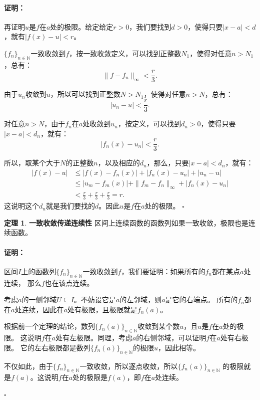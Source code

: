 \documentclass[12pt,UTF8]{ctexbook}
\theoremstyle{definition}
\newtheorem{tm}{定理}[section]
\theoremstyle{plain}
\renewenvironment{proof}{\paragraph{\textbf{证明：}}}{\hfill$\square$}
\begin{document}
\begin{appendix}
\begin{proof}
    再证明$u$是$f$在$a$处的极限。给定给定$r>0$，我们要找到$d>0$，使得只要$|x - a| < d$，就有$|f(x) - u| < r$。
    
    $\{f_n\}_{n\in\mathbb{N}}$一致收敛到$f$，按一致收敛定义，可以找到正整数$N_1$，使得对任意$n>N_1$，总有：
    $$ \| f - f_n\|_{\infty} < \frac{r}{3}.$$

    由于$u_n$收敛到$u$，所以可以找到正整数$N>N_1$，使得对任意$n>N$，总有：
    $$ |u_n - u| < \frac{r}{3}.$$
    
    对任意$n>N$，由于$f_n$在$a$处收敛到$u_n$，按定义，可以找到$d_n > 0$，使得只要$|x - a| < d_n$，就有：
    $$ |f_n(x) - u_n| < \frac{r}{3}.$$

    所以，取某个大于$N$的正整数$n$，以及相应的$d_n$，那么，只要$|x - a| < d_n$，就有：
    \begin{align*}
        |f(x) - u| &\leqslant |f(x) - f_n(x)| + |f_n(x) - u_n| + |u_n - u| \\
        &\leqslant |u_m - f_m(x)| + \| f_m - f_n\|_{\infty} + |f_n(x) - u_n| \\
        &< \frac{r}{3} + \frac{r}{3} + \frac{r}{3} = r.
    \end{align*}
    这说明这个$d_n$就是我们要找的$d$。因此$u$是$f$在$a$处的极限。
\end{proof}

\begin{tm}{\textbf{一致收敛传递连续性}}
    区间上连续函数的函数列如果一致收敛，极限也是连续函数。
\end{tm}

\begin{proof}
    区间$I$上的函数列$\{f_n\}_{n\in\mathbb{N}}$一致收敛到$f$，我们要证明：如果所有的$f_n$都在某点$a$处连续，
    那么$f$也在该点连续。

    考虑$a$的一侧邻域$U\subseteq I$。不妨设它是$a$的左邻域，则$a$是它的右端点。
    所有的$f_n$都在$a$处连续，因此在$a$处有极限，且极限就是$f_n(a)$。

    根据前一个定理的结论，数列$\{f_n(a)\}_{n\in\mathbb{N}}$收敛到某个数$u$，且$u$是$f$在$a$处的极限。
    这说明$f$在$a$处有左极限。同理，考虑$a$的右侧邻域，可以证明$f$在$a$处有右极限。
    它的左右极限都是数列$\{f_n(a)\}_{n\in\mathbb{N}}$的极限$u$，因此相等。
    
    不仅如此，由于$\{f_n\}_{n\in\mathbb{N}}$一致收敛，所以逐点收敛，所以$\{f_n(a)\}_{n\in\mathbb{N}}$
    的极限就是$f(a)$。这说明$f$在$a$处的极限是$f(a)$，即$f$在$a$处连续。

\end{proof}


\end{appendix}
\end{document}
